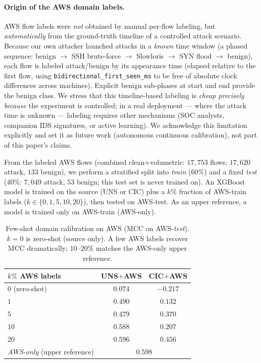 \documentclass[preprint,12pt,authoryear]{elsarticle}
\begin{document}
\paragraph{Origin of the AWS domain labels.} AWS flow labels were \emph{not}
obtained by manual per-flow labeling, but \emph{automatically} from the
ground-truth timeline of a controlled attack scenario. Because our own attacker
launched attacks in a \emph{known} time window (a phased sequence: benign
$\rightarrow$ SSH brute-force $\rightarrow$ Slowloris $\rightarrow$ SYN flood
$\rightarrow$ benign), each flow is labeled attack/benign by its appearance time
(elapsed relative to the first flow, using
\texttt{bidirectional\_first\_seen\_ms} to be free of absolute clock differences
across machines). Explicit benign sub-phases at start and end provide the benign
class. We stress that this timeline-based labeling is \emph{cheap precisely
because} the experiment is controlled; in a real deployment --- where the attack
time is unknown --- labeling requires other mechanisms (SOC analysts, companion
IDS signatures, or active learning). We acknowledge this limitation explicitly and
set it as future work (autonomous continuous calibration), not part of this
paper's claims.

From the labeled AWS flows (combined clean+volumetric: $17{,}753$ flows;
$17{,}620$ attack, $133$ benign), we perform a stratified split into \emph{train}
($60\%$) and a fixed \emph{test} ($40\%$: $7{,}049$ attack, $53$ benign; this test
set is never trained on). An XGBoost model is trained on the source (UNS or CIC)
plus a $k\%$ fraction of AWS-train labels ($k\in\{0,1,5,10,20\}$), then tested on
AWS-test. As an upper reference, a model is trained only on AWS-train (AWS-only).

\begin{table}[h]
\centering
\caption{Few-shot domain calibration on AWS (MCC on AWS-\emph{test}). $k=0$ is
zero-shot (source only). A few AWS labels recover MCC dramatically; $10$--$20\%$
matches the AWS-only upper reference.}
\label{tab:rt-fewshot}
\small
\begin{tabular}{lcc}
\toprule
$k\%$ AWS labels & UNS$+$AWS & CIC$+$AWS \\
\midrule
$0$ (zero-shot) & $0.074$ & $-0.217$ \\
$1$   & $0.490$ & $0.132$ \\
$5$   & $0.479$ & $0.370$ \\
$10$  & $0.588$ & $0.207$ \\
$20$  & $0.596$ & $0.456$ \\
\midrule
\emph{AWS-only} (upper reference) & \multicolumn{2}{c}{$0.598$} \\
\bottomrule
\end{tabular}
\end{table}
\end{document}
